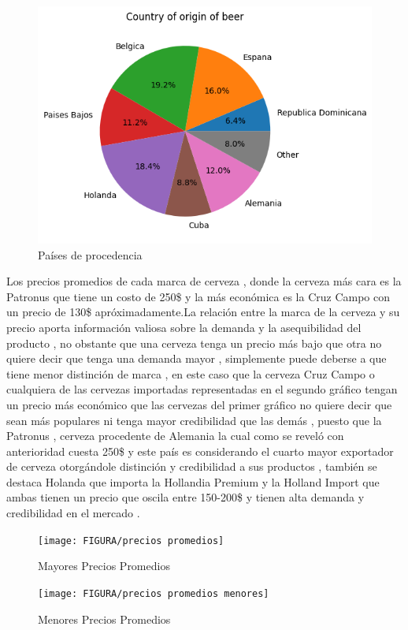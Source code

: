 \documentclass[10pt]{beamer}
\begin{document}
   	\begin{figure}
   		\centering
   		\includegraphics[width=0.7\linewidth]{FIGURA/países de origen}
   		\caption{Países de procedencia}
   		\label{fig:paises-de-origen}
   	\end{figure}
   	
   	
   	\begin{frame}
   		
   	    Los precios promedios de cada marca de cerveza , donde la cerveza más cara es la Patronus que tiene un costo de 250\$ y la más económica es la Cruz Campo con un precio de 130\$ apróximadamente.La relación entre la marca de la cerveza y su precio aporta información valiosa sobre la demanda y la asequibilidad del producto , no obstante que una cerveza tenga un precio más bajo que otra no quiere decir que tenga una demanda mayor , simplemente puede deberse a que tiene menor distinción de marca , en este caso que la cerveza Cruz Campo o cualquiera de las cervezas importadas representadas en el segundo gráfico tengan un precio más económico que las cervezas del primer gráfico no quiere decir que sean más populares ni tenga mayor credibilidad que las demás , puesto que la Patronus , cerveza procedente de Alemania la cual como se reveló con anterioridad cuesta 250\$ y este país es considerando el cuarto mayor exportador de cerveza otorgándole distinción y credibilidad a sus productos , también se destaca Holanda que importa la Hollandia Premium y la Holland Import que ambas tienen un precio que oscila entre 150-200\$ y tienen alta demanda y credibilidad en el mercado . 
   	    
   	\end{frame}
   	
   	
   	\begin{frame}
   	
   	\begin{figure}
   		\centering
   		\texttt{[image: FIGURA/precios promedios]}
   		\caption{Mayores Precios Promedios}
   		\label{fig:precios-promedios}
   	\end{figure}
   	
   	\begin{figure}
   		\centering
   		\texttt{[image: FIGURA/precios promedios menores]}
   		\caption{Menores Precios Promedios}
   		\label{fig:precios-promedios-menores}
   	\end{figure}
   	
   	\end{frame}
   	
\end{document}
